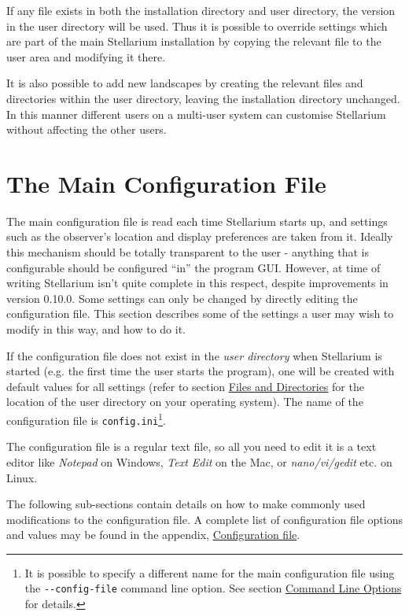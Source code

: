 If any file exists in both the installation directory and user
directory, the version in the user directory will be used. Thus it is
possible to override settings which are part of the main Stellarium
installation by copying the relevant file to the user area and modifying
it there.

It is also possible to add new landscapes by creating the relevant files
and directories within the user directory, leaving the installation
directory unchanged. In this manner different users on a multi-user
system can customise Stellarium without affecting the other users.

\chapter{The Main Configuration
File}\label{the-main-configuration-file}

The main configuration file is read each time Stellarium starts up, and
settings such as the observer's location and display preferences are
taken from it. Ideally this mechanism should be totally transparent to
the user - anything that is configurable should be configured ``in'' the
program GUI. However, at time of writing Stellarium isn't quite complete
in this respect, despite improvements in version 0.10.0. Some settings
can only be changed by directly editing the configuration file. This
section describes some of the settings a user may wish to modify in this
way, and how to do it.

If the configuration file does not exist in the \emph{user directory}
when Stellarium is started (e.g. the first time the user starts the
program), one will be created with default values for all settings
(refer to section \href{Advanced_Use\#Files_and_Directories}{Files and
Directories} for the location of the user directory on your operating
system). The name of the configuration file is
\texttt{config.ini}\footnote{It is possible to specify a different name
  for the main configuration file using the \texttt{-\/-config-file}
  command line option. See section
  \href{Advanced_Use\#Command_Line_Options}{Command Line Options} for
  details.}.

The configuration file is a regular text file, so all you need to edit
it is a text editor like \emph{Notepad} on Windows, \emph{Text Edit} on
the Mac, or \emph{nano/vi/gedit} etc. on Linux.

The following sub-sections contain details on how to make commonly used
modifications to the configuration file. A complete list of
configuration file options and values may be found in the appendix,
\href{Configuration_file}{Configuration file}.

